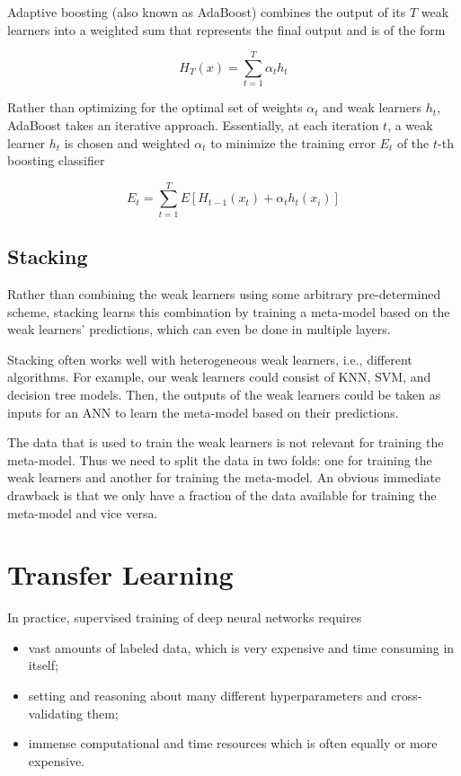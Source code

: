 Adaptive boosting (also known as AdaBoost) \cite{adaboost} combines the output of its $T$ weak learners into a weighted sum that represents the final output and is of the form

$$
H_T(x) = \sum_{t=1}^{T} \alpha_t h_t
$$

Rather than optimizing for the optimal set of weights $\alpha_t$ and weak learners $h_t$, AdaBoost takes an iterative approach. Essentially, at each iteration $t$, a weak learner $h_t$ is chosen and weighted $\alpha_t$ to minimize the training error $E_t$ of the $t$-th boosting classifier

$$
E_t = \sum_{t=1}^{T} E[H_{t-1}(x_t) + \alpha_t h_t(x_i)]
$$

\subsection{Stacking}

Rather than combining the weak learners using some arbitrary pre-determined scheme, stacking learns this combination by training a meta-model based on the weak learners' predictions, which can even be done in multiple layers.

Stacking often works well with heterogeneous weak learners, i.e., different algorithms. For example, our weak learners could consist of \ac{KNN}, \ac{SVM}, and decision tree models. Then, the outputs of the weak learners could be taken as inputs for an \ac{ANN} to learn the meta-model based on their predictions.

The data that is used to train the weak learners is not relevant for training the meta-model. Thus we need to split the data in two folds: one for training the weak learners and another for training the meta-model. An obvious immediate drawback is that we only have a fraction of the data available for training the meta-model and vice versa.

\section{Transfer Learning}
\label{section:transferlearning}

In practice, supervised training of deep neural networks requires

\begin{itemize}
    \item vast amounts of labeled data, which is very expensive and time consuming in itself;
    \item setting and reasoning about many different hyperparameters and cross-validating them;
    \item immense computational and time resources which is often equally or more expensive.
\end{itemize}

